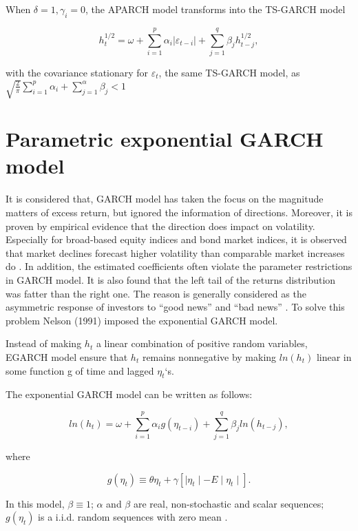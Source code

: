 When $\delta=1,\gamma_{i}=0$, the APARCH model transforms into the TS-GARCH model

\begin{equation}
h_{t}^{1/2} = \omega + \sum_{i=1}^{p}\alpha_{i}|\varepsilon_{t-i}|+\sum_{j=1}^{q}\beta_{j}h_{t-j}^{1/2},
\end{equation}

with the covariance stationary for  $\varepsilon_{t}$, the same TS-GARCH model, as  $\sqrt{\frac{2}{\pi}} \sum_{i=1}^{p}\alpha_{i} + \sum_{j=1}^{\alpha}\beta_{j}<1$ \cite{Zakoian1994}

\section{Parametric exponential GARCH model}

It is considered that, GARCH model has taken the focus on the magnitude matters of excess return, but ignored the information of directions. Moreover, it is proven by empirical evidence that the direction does impact on volatility. Especially for broad-based equity indices and bond market indices, it is observed that market declines forecast higher volatility than comparable market increases do \cite{Engle2001}. In addition, the estimated coefficients often violate the parameter restrictions in GARCH model. It is also found that the left tail of the returns distribution was fatter than the right one. The reason is generally considered as the asymmetric response of investors to “good news” and “bad news” \cite{Jondeau2003}. To solve this problem Nelson (1991) imposed the exponential GARCH model.

Instead of making $h_{t}$  a linear combination of positive random variables, EGARCH model ensure that $h_{t}$  remains nonnegative by making $ln(h_{t})$ linear in some function g of time and lagged $\eta_{t}$‘s.

The exponential GARCH model can be written as follows:

\begin{equation}
ln(h_t) =\omega + \sum_{i=1}^p\alpha_ig(\eta_{t-i})+\sum_{j=1}^q\beta_jln(h_{t-j}),
\end{equation}

where

\begin{equation}
g(\eta_{t}) \equiv \theta\eta_t + \gamma[\mid\eta_t\mid-E\mid\eta_t\mid]. 
\end{equation}

In this model, $\beta\equiv 1 $; $\alpha$ and $\beta$ are real, non-stochastic and scalar sequences; $g(\eta_t)$ is a i.i.d. random sequences with zero mean \cite{Malmsten2004}.

